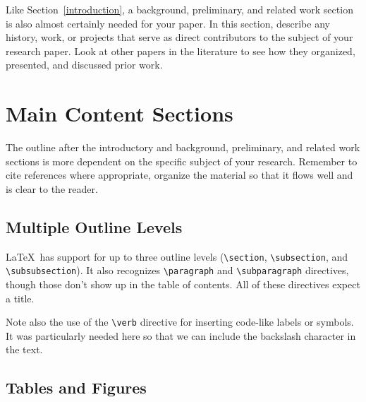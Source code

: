 \documentclass{article}
\begin{document}
Like Section~\ref{introduction}, a background, preliminary, and related work section is also almost certainly needed for your paper.  In this section, describe any history, work, or projects that serve as direct contributors to the subject of your research paper.  Look at other papers in the literature to see how they organized, presented, and discussed prior work.


\section{Main Content Sections}

The outline after the introductory and background, preliminary, and related work sections is more dependent on the specific subject of your research.  Remember to cite references where appropriate, organize the material so that it flows well and is clear to the reader.

\subsection{Multiple Outline Levels}

\LaTeX\ has support for up to three outline levels (\verb!\section!, \verb!\subsection!, and \verb!\subsubsection!).  It also recognizes \verb!\paragraph! and \verb!\subparagraph! directives, though those don't show up in the table of contents.  All of these directives expect a title.

Note also the use of the \verb!\verb! directive for inserting code-like labels or symbols.  It was particularly needed here so that we can include the backslash character in the text.

\subsection{Tables and Figures}
\end{document}
